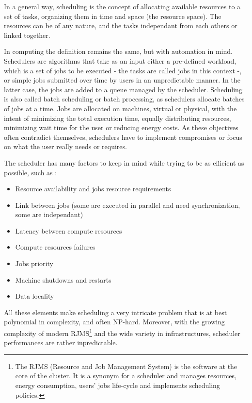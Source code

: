 \documentclass[12pt, a4paper]{memoir}
\begin{document}
In a general way, scheduling is the concept of allocating available resources
to a set of tasks, organizing them in time and space (the resource space). The
resources can be of any nature, and the tasks independant from each others or
linked together.

In computing the definition remains the same, but with automation in mind.
Schedulers are algorithms that take as an input either a pre-defined workload,
which is a set of jobs  to be executed - the tasks are called jobs in this
context -, or simple jobs submitted over time by users in an unpredictable
manner. In the latter case, the jobs are added to a queue managed by the
scheduler. Scheduling is also called batch scheduling or batch processing, as
schedulers allocate batches of jobs at a time. Jobs are allocated on machines,
virtual or physical, with the intent of minimizing the total execution time,
equally distributing resources, minimizing wait time for the user or reducing
energy costs. As these objectives often contradict themselves, schedulers have
to implement compromises or focus on what the user really needs or requires.  

The scheduler has many factors to keep in mind while trying to be as efficient
as possible, such as :

\begin{itemize}
	\item Resource availability and jobs resource requirements
	\item Link between jobs (some are executed in parallel and need synchronization, some are independant)
	\item Latency between compute resources
	\item Compute resources failures
	\item Jobs priority
	\item Machine shutdowns and restarts
	\item Data locality
\end{itemize}

All these elements make scheduling a very intricate problem that is at best
polynomial in complexity, and often NP-hard\cite{scheduler-complexity}.
Moreover, with the growing complexity of modern RJMS\footnote{The RJMS
	(Resource and Job Management System) is the software at the core of the
	cluster. It is a synonym for a scheduler and manages resources, energy
	consumption, users' jobs life-cycle and implements scheduling
	policies.} and the wide variety in infrastructures, scheduler
performances are rather inpredictable.
\end{document}
